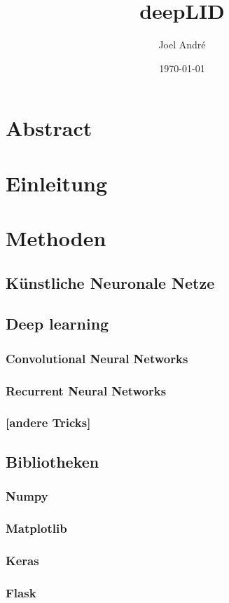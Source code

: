 \documentclass{article}
\title{deepLID}
\author{Joel André}
\date{\today{}}
\begin{document}
	\maketitle
	\newpage
	\tableofcontents
	
	\section{Abstract}
	\section{Einleitung}
	\section{Methoden}
	\subsection{Künstliche Neuronale Netze}
	\subsection{Deep learning}
	\subsubsection{Convolutional Neural Networks}
	\subsubsection{Recurrent Neural Networks}
	\subsubsection{[andere Tricks]}
	\subsection{Bibliotheken}
	\subsubsection{Numpy}
	\subsubsection{Matplotlib}
	\subsubsection{Keras}
	\subsubsection{Flask}
\end{document}

